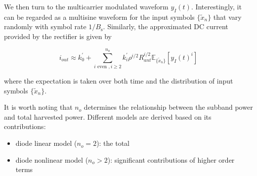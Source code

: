 We then turn to the multicarrier modulated waveform ${y_I}(t)$. Interestingly, it can be regarded as a multisine waveform for the input symbols $\{ {{\tilde x}_n}\} $ that vary randomly with symbol rate $1/{B_{\text{s}}}$. Similarly, the approximated DC current provided by the rectifier is given by

\begin{equation}\label{eqn:current_information}
  {i_{out}} \approx k_0^\prime  + \sum\limits_{i{\text{ even }},i \geqslant 2}^{{n_o}} {k_i^\prime } {\rho ^{i/2}}R_{ant}^{i/2}{\mathbb{E}_{\{ {{\tilde x}_n}\} }}\left[ {{y_I}{{(t)}^i}} \right]
\end{equation}

where the expectation is taken over both time and the distribution of input symbols $\{ {{\tilde x}_n}\} $.



























It is worth noting that ${n_o}$ determines the relationship between the subband power and total harvested power. Different models are derived based on its contributions:

\begin{itemize}
  \item diode linear model (${n_o} = 2$): the total
  \item diode nonlinear model (${n_o} > 2$): significant contributions of higher order terms
\end{itemize} 